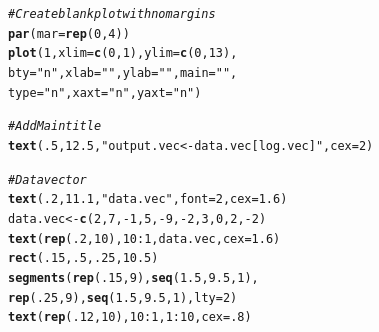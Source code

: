 \documentclass{tufte-book}\usepackage[]{graphicx}\usepackage[]{color}
\makeatletter
\newcommand{\hlnum}[1]{\textcolor[rgb]{0.686,0.059,0.569}{#1}}%
\newcommand{\hlstr}[1]{\textcolor[rgb]{0.192,0.494,0.8}{#1}}%
\newcommand{\hlcom}[1]{\textcolor[rgb]{0.678,0.584,0.686}{\textit{#1}}}%
\newcommand{\hlopt}[1]{\textcolor[rgb]{0,0,0}{#1}}%
\newcommand{\hlstd}[1]{\textcolor[rgb]{0.345,0.345,0.345}{#1}}%
\newcommand{\hlkwb}[1]{\textcolor[rgb]{0.69,0.353,0.396}{#1}}%
\newcommand{\hlkwc}[1]{\textcolor[rgb]{0.333,0.667,0.333}{#1}}%
\newcommand{\hlkwd}[1]{\textcolor[rgb]{0.737,0.353,0.396}{\textbf{#1}}}%
\newenvironment{kframe}{%
 \def\at@end@of@kframe{}%
 \ifinner\ifhmode%
  \def\at@end@of@kframe{\end{minipage}}%
  \begin{minipage}{\columnwidth}%
 \fi\fi%
 \def\FrameCommand##1{\hskip\@totalleftmargin \hskip-\fboxsep
 \colorbox{shadecolor}{##1}\hskip-\fboxsep
     \hskip-\linewidth \hskip-\@totalleftmargin \hskip\columnwidth}%
 \MakeFramed {\advance\hsize-\width
   \@totalleftmargin\z@ \linewidth\hsize
   \@setminipage}}%
 {\par\unskip\endMakeFramed%
 \at@end@of@kframe}
\newenvironment{knitrout}{}{} %
\makeatother
\begin{document}
\begin{marginfigure}
\begin{tiny}
\begin{knitrout}
\color{fgcolor}\begin{kframe}
\begin{alltt}
\hlcom{# Create blank plot with no margins}
\hlkwd{par}\hlstd{(}\hlkwc{mar} \hlstd{=} \hlkwd{rep}\hlstd{(}\hlnum{0}\hlstd{,} \hlnum{4}\hlstd{))}
\hlkwd{plot}\hlstd{(}\hlnum{1}\hlstd{,} \hlkwc{xlim} \hlstd{=} \hlkwd{c}\hlstd{(}\hlnum{0}\hlstd{,} \hlnum{1}\hlstd{),} \hlkwc{ylim} \hlstd{=} \hlkwd{c}\hlstd{(}\hlnum{0}\hlstd{,} \hlnum{13}\hlstd{),}
     \hlkwc{bty} \hlstd{=} \hlstr{"n"}\hlstd{,} \hlkwc{xlab} \hlstd{=} \hlstr{""}\hlstd{,} \hlkwc{ylab} \hlstd{=} \hlstr{""}\hlstd{,} \hlkwc{main} \hlstd{=} \hlstr{""}\hlstd{,}
     \hlkwc{type} \hlstd{=} \hlstr{"n"}\hlstd{,} \hlkwc{xaxt} \hlstd{=} \hlstr{"n"}\hlstd{,} \hlkwc{yaxt} \hlstd{=} \hlstr{"n"}\hlstd{)}

\hlcom{# Add Main title}
\hlkwd{text}\hlstd{(}\hlnum{.5}\hlstd{,} \hlnum{12.5}\hlstd{,} \hlstr{"output.vec <- data.vec[log.vec]"}\hlstd{,} \hlkwc{cex} \hlstd{=} \hlnum{2}\hlstd{)}

\hlcom{# Data vector}
\hlkwd{text}\hlstd{(}\hlnum{.2}\hlstd{,} \hlnum{11.1}\hlstd{,} \hlstr{"data.vec"}\hlstd{,} \hlkwc{font} \hlstd{=} \hlnum{2}\hlstd{,} \hlkwc{cex} \hlstd{=} \hlnum{1.6}\hlstd{)}
\hlstd{data.vec} \hlkwb{<-} \hlkwd{c}\hlstd{(}\hlnum{2}\hlstd{,} \hlnum{7}\hlstd{,} \hlopt{-}\hlnum{1}\hlstd{,} \hlnum{5}\hlstd{,} \hlopt{-}\hlnum{9}\hlstd{,} \hlopt{-}\hlnum{2}\hlstd{,} \hlnum{3}\hlstd{,} \hlnum{0}\hlstd{,} \hlnum{2}\hlstd{,} \hlopt{-}\hlnum{2}\hlstd{)}
\hlkwd{text}\hlstd{(}\hlkwd{rep}\hlstd{(}\hlnum{.2}\hlstd{,} \hlnum{10}\hlstd{),} \hlnum{10}\hlopt{:}\hlnum{1}\hlstd{, data.vec,} \hlkwc{cex} \hlstd{=} \hlnum{1.6}\hlstd{)}
\hlkwd{rect}\hlstd{(}\hlnum{.15}\hlstd{,} \hlnum{.5}\hlstd{,} \hlnum{.25}\hlstd{,} \hlnum{10.5}\hlstd{)}
\hlkwd{segments}\hlstd{(}\hlkwd{rep}\hlstd{(}\hlnum{.15}\hlstd{,} \hlnum{9}\hlstd{),} \hlkwd{seq}\hlstd{(}\hlnum{1.5}\hlstd{,} \hlnum{9.5}\hlstd{,} \hlnum{1}\hlstd{),}
         \hlkwd{rep}\hlstd{(}\hlnum{.25}\hlstd{,} \hlnum{9}\hlstd{),} \hlkwd{seq}\hlstd{(}\hlnum{1.5}\hlstd{,} \hlnum{9.5}\hlstd{,} \hlnum{1}\hlstd{),} \hlkwc{lty} \hlstd{=} \hlnum{2}\hlstd{)}
\hlkwd{text}\hlstd{(}\hlkwd{rep}\hlstd{(}\hlnum{.12}\hlstd{,} \hlnum{10}\hlstd{),} \hlnum{10}\hlopt{:}\hlnum{1}\hlstd{,} \hlnum{1}\hlopt{:}\hlnum{10}\hlstd{,} \hlkwc{cex} \hlstd{=} \hlnum{.8}\hlstd{)}


\end{alltt}
\end{kframe}
\end{knitrout}
\end{tiny}
\end{marginfigure}
\end{document}
